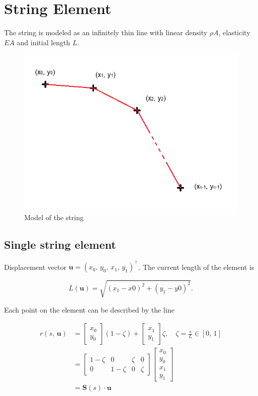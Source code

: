 \newpage
\section{String Element}

The string is modeled as an infinitely thin line with linear density $\rho A$, elasticity $EA$ and initial length $L$.

\begin{figure}[h]
\centering
\includegraphics[width=0.6\linewidth]{figures/elements/string-element.png}
\caption{Model of the string}
\label{fig:elements:string-element}
\end{figure}

\subsection{Single string element}

Displacement vector $\boldsymbol{u} = (x_0,\,y_0,\,x_1,\,y_1)^\intercal$. The current length of the element is

$$
\overline{L}(\boldsymbol{u}) = \sqrt{(x_{1} - x{0})^2 + (y_{1} - y{0})^2}.
$$

Each point on the element can be described by the line

\begin{align*}
r(s,\,\boldsymbol{u}) &= \begin{bmatrix} x_0 \\ y_0 \end{bmatrix}(1 - \zeta) + \begin{bmatrix} x_1 \\ y_1 \end{bmatrix} \zeta, \quad \zeta = \frac{s}{L} \in [0,\,1] \\
&=
\begin{bmatrix}
1 - \zeta & 0 & \zeta & 0 \\
0 & 1 - \zeta & 0 & \zeta
\end{bmatrix}
\begin{bmatrix}
x_0 \\ y_0 \\ x_1 \\ y_1
\end{bmatrix}
\\
&= \boldsymbol{S}(s) \cdot \boldsymbol{u}
\end{align*}

